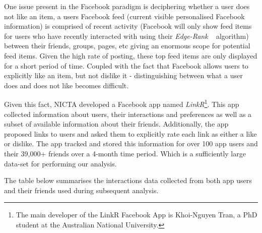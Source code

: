 One issue present in the Facebook paradigm is deciphering whether a user does not like an item, a users Facebook feed (current visible 
personalised Facebook information) is comprised of recent
activity (Facebook will only show feed 
items for users who have recently interacted with using their \emph{Edge-Rank} ~\cite{edge} algorithm) between their friends, groups, pages, etc giving an enormous scope for potential feed items.
Given the high rate of posting, these top feed items are only displayed for a short period of time. Coupled 
with the fact that Facebook allows users to explicitly like an item, but not dislike it - distinguishing between what 
a user does and does not like becomes difficult.


Given this fact, NICTA developed a Facebook app named \emph{LinkR}\footnote{The main developer of the LinkR Facebook App is Khoi-Nguyen Tran, a PhD student at the Australian National University.}.
This app collected information about users, their interactions and preferences as well as a subset of available information about 
their friends. Additionally, the app proposed links to users and asked them to explicitly rate each link as either a like or dislike. 
The app tracked and stored this information for over 100 app users and their 39,000+ friends over a 4-month time period. Which is a sufficiently large data-set for 
performing our analysis.

The table below summarises the interactions data collected from both app users and their friends used during subsequent analysis.

